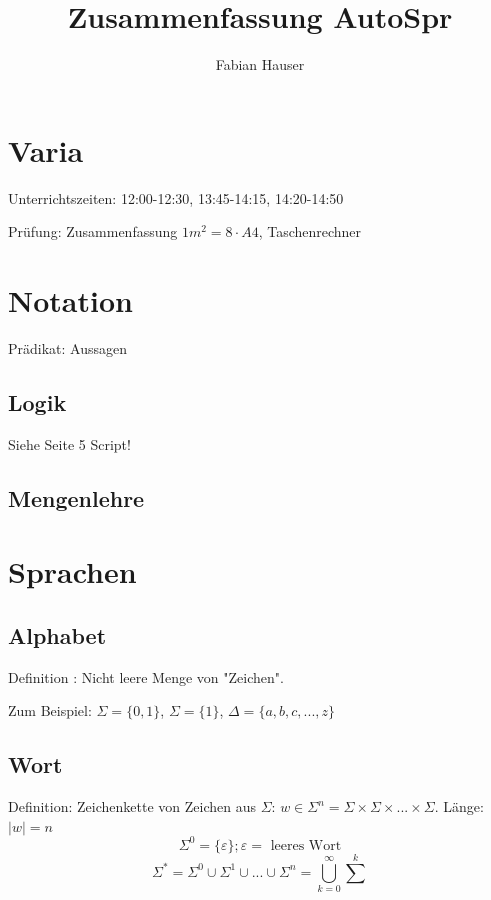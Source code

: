 

\title{Zusammenfassung AutoSpr}
\author{Fabian Hauser}
 

\maketitle

\section{Varia}
Unterrichtszeiten: 12:00-12:30, 13:45-14:15, 14:20-14:50

Prüfung: Zusammenfassung $1m^2  = 8 \cdot A4$, Taschenrechner


\section{Notation}
Prädikat:	Aussagen

\subsection{Logik}
Siehe Seite 5 Script!

\subsection{Mengenlehre}

\section{Sprachen}

\subsection{Alphabet}
Definition : Nicht leere Menge von "Zeichen".

Zum Beispiel: $\Sigma = \{0, 1\}$, $\Sigma = \{1\}$, $\Delta = \{a,b,c,...,z\}$


\subsection{Wort}

Definition: Zeichenkette von Zeichen aus $\Sigma$: $w \in \Sigma^n = \Sigma \times \Sigma \times ... \times \Sigma$. Länge: $|w| = n$
\[
	\Sigma^0 = \{\varepsilon\}; \varepsilon = \text{ leeres Wort}
\]
\[
	\Sigma^\ast = \Sigma^0 \cup \Sigma^1 \cup ... \cup \Sigma^n = \bigcup^{\infty}_{k=0}{\sum^k}
\]

